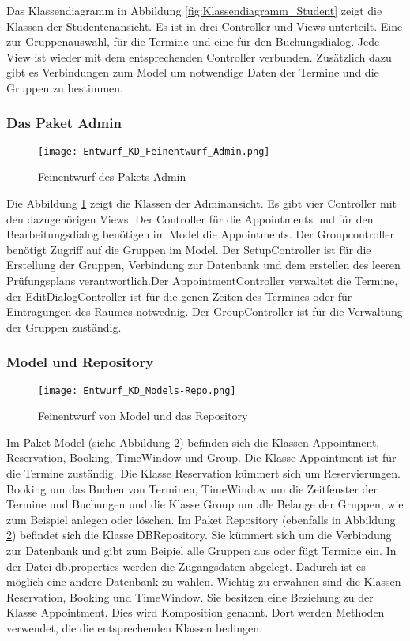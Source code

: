 \documentclass[a4paper,10pt]{article}
\begin{document}
Das Klassendiagramm in Abbildung \ref{fig:Klassendiagramm_Student} zeigt die Klassen der Studentenansicht. Es ist in drei Controller und Views unterteilt. Eine zur Gruppenauswahl, für die Termine und eine für den Buchungsdialog.
 Jede View ist wieder mit dem entsprechenden Controller verbunden. Zusätzlich dazu gibt es Verbindungen zum Model um notwendige Daten der Termine und die Gruppen zu bestimmen.
 
 \subsubsection{Das Paket Admin}
 \begin{figure}
  \texttt{[image: Entwurf\_KD\_Feinentwurf\_Admin.png]}
  \label{fig:Klassendiagramm_Admin}
  \caption{Feinentwurf des Pakets Admin}
 \end{figure} 

 Die Abbildung \ref{fig:Klassendiagramm_Admin} zeigt die Klassen der Adminansicht. Es gibt vier Controller mit den dazugehörigen Views. Der Controller für die Appointments und für den Bearbeitungsdialog benötigen im Model die Appointments. Der Groupcontroller benötigt Zugriff auf die Gruppen im Model.
 Der SetupController ist f\"ur die Erstellung der Gruppen, Verbindung zur Datenbank und dem erstellen des leeren Pr\"ufungsplans verantwortlich.Der AppointmentController verwaltet die Termine, der EditDialogController ist f\"ur die genen Zeiten des Termines oder f\"ur Eintragungen des Raumes notwednig.
 Der GroupController ist f\"ur die Verwaltung der Gruppen zust\"andig.
 \subsubsection{Model und Repository}
 
 \begin{figure}
  \texttt{[image: Entwurf\_KD\_Models-Repo.png]}
  \label{fig:Klassendiagramm_Models-Repo}
\caption{Feinentwurf von Model und das Repository}
 \end{figure} 

Im Paket Model (siehe Abbildung \ref{fig:Klassendiagramm_Models-Repo}) befinden sich die Klassen Appointment, Reservation, Booking, TimeWindow und Group. Die Klasse Appointment ist für die Termine zuständig. Die Klasse Reservation kümmert sich um Reservierungen. Booking um das Buchen von Terminen, TimeWindow um die Zeitfenster der Termine und Buchungen und die Klasse Group um alle Belange der Gruppen, wie zum Beispiel anlegen oder löschen.
Im Paket Repository (ebenfalls in Abbildung \ref{fig:Klassendiagramm_Models-Repo}) befindet sich die Klasse DBRepository. Sie kümmert sich um die Verbindung zur Datenbank und gibt zum Beipiel alle Gruppen aus oder fügt Termine ein.
In der Datei db.properties werden die Zugangsdaten abgelegt. Dadurch ist es m\"oglich eine andere Datenbank zu w\"ahlen.
Wichtig zu erw\"ahnen sind die Klassen Reservation, Booking und TimeWindow. Sie besitzen eine Beziehung zu der Klasse Appointment. Dies wird Komposition genannt. Dort werden Methoden verwendet, die die entsprechenden Klassen bedingen.
\end{document}

